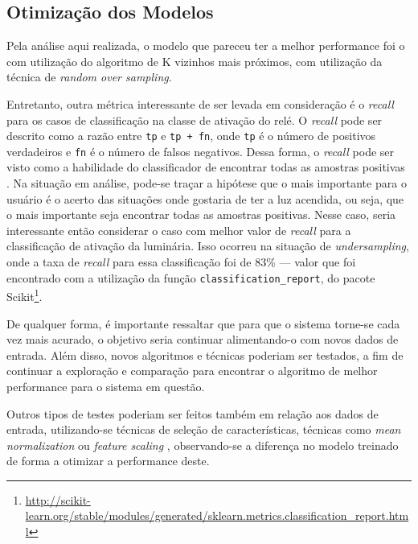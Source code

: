 		\subsection{Otimização dos Modelos}

			Pela análise aqui realizada, o modelo que pareceu ter a melhor performance foi o com utilização do algoritmo de K vizinhos mais próximos, com utilização da técnica de \emph{random over sampling}.

			Entretanto, outra métrica interessante de ser levada em consideração é o \emph{recall} para os casos de classificação na classe de ativação do relé. O \emph{recall} pode ser descrito como a razão entre \texttt{tp} e \texttt{tp + fn}, onde \texttt{tp} é  o número de positivos verdadeiros e \texttt{fn} é o número de falsos negativos. Dessa forma, o \emph{recall} pode ser visto como a habilidade do classificador de encontrar todas as amostras positivas \cite{precisionAndRecall}. Na situação em análise, pode-se traçar a hipótese que o mais importante para o usuário é o acerto das situações onde gostaria de ter a luz acendida, ou seja, que o mais importante seja encontrar todas as amostras positivas. Nesse caso, seria interessante então considerar o caso com melhor valor de \emph{recall} para a classificação de ativação da luminária. Isso ocorreu na situação de \emph{undersampling}, onde a taxa de \emph{recall} para essa classificação foi de 83\% --- valor que foi encontrado com a utilização da função \texttt{classification\_report}, do pacote Scikit\footnote{\url{http://scikit-learn.org/stable/modules/generated/sklearn.metrics.classification_report.html}}.

			De qualquer forma, é importante ressaltar que para que o sistema torne-se cada vez mais acurado, o objetivo seria continuar alimentando-o com novos dados de entrada. Além disso, novos algoritmos e técnicas poderiam ser testados, a fim de continuar a exploração e comparação para encontrar o algoritmo de melhor performance para o sistema em questão.

			Outros tipos de testes poderiam ser feitos também em relação aos dados de entrada, utilizando-se técnicas de seleção de características, técnicas como \emph{mean normalization} ou \emph{feature scaling} \cite{Coursera}, observando-se a diferença no modelo treinado de forma a otimizar a performance deste.
